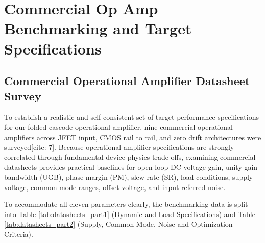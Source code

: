 \documentclass[conference]{IEEEtran}
\begin{document}
\section{Commercial Op Amp Benchmarking and Target Specifications}

\subsection{Commercial Operational Amplifier Datasheet Survey}
To establish a realistic and self consistent set of target performance specifications for our folded cascode operational amplifier, nine commercial operational amplifiers across JFET input, CMOS rail to rail, and zero drift architectures were surveyed[cite: 7]. Because operational amplifier specifications are strongly correlated through fundamental device physics trade offs, examining commercial datasheets provides practical baselines for open loop DC voltage gain, unity gain bandwidth (UGB), phase margin (PM), slew rate (SR), load conditions, supply voltage, common mode ranges, offset voltage, and input referred noise. 

To accommodate all eleven parameters clearly, the benchmarking data is split into Table \ref{tab:datasheets_part1} (Dynamic and Load Specifications) and Table \ref{tab:datasheets_part2} (Supply, Common Mode, Noise and Optimization Criteria).
\end{document}
